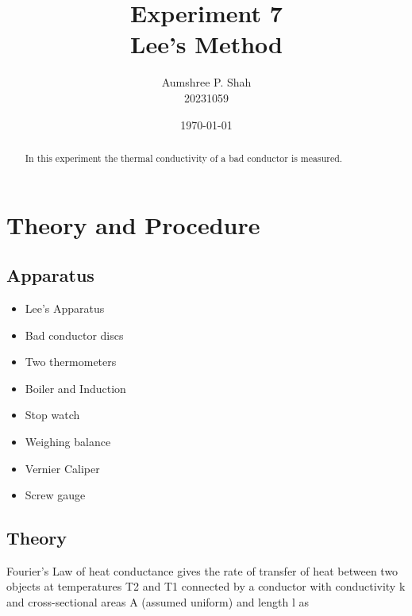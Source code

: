 \documentclass[%
 sor,
 jor,
 amsmath,amssymb,
 reprint,
]{revtex4-2}
\begin{document}
\title{Experiment 7\\Lee's Method}

\author{Aumshree P. Shah\\20231059}
\date{\today}

\begin{abstract}
\centering
In this experiment the thermal conductivity of a bad conductor is measured.
\end{abstract}

\maketitle

\section{Theory and Procedure}
\subsection{Apparatus}
\small
\begin{minipage}{0.48\textwidth}
\begin{itemize}
	\item Lee’s Apparatus
	\item Bad conductor discs 
	\item Two thermometers
	\item Boiler and Induction
\end{itemize}
\end{minipage}
\begin{minipage}{0.48\textwidth}
\begin{itemize}
	\item Stop watch 
	\item Weighing balance 
	\item  Vernier Caliper 
	\item  Screw gauge
\end{itemize}
\end{minipage}
\subsection{Theory}
Fourier’s Law of heat conductance gives the rate of transfer of heat between two objects at temperatures T2 and T1 connected by a conductor with conductivity k and cross-sectional areas A (assumed uniform) and length l as %
\end{document}
